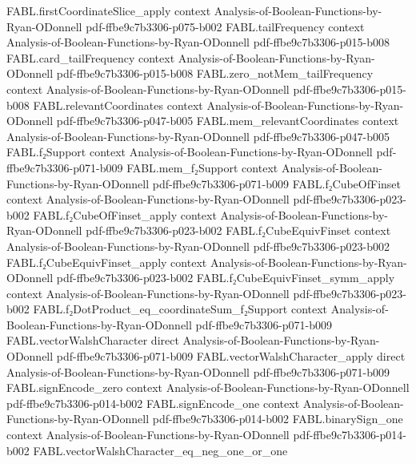 \begin{theorem}
\proofstep
  {FABL.firstCoordinateSlice_apply}
  {context}
  {Analysis-of-Boolean-Functions-by-Ryan-ODonnell}
  {pdf-ffbe9c7b3306-p075-b002}
\proofstep
  {FABL.tailFrequency}
  {context}
  {Analysis-of-Boolean-Functions-by-Ryan-ODonnell}
  {pdf-ffbe9c7b3306-p015-b008}
\proofstep
  {FABL.card_tailFrequency}
  {context}
  {Analysis-of-Boolean-Functions-by-Ryan-ODonnell}
  {pdf-ffbe9c7b3306-p015-b008}
\proofstep
  {FABL.zero_notMem_tailFrequency}
  {context}
  {Analysis-of-Boolean-Functions-by-Ryan-ODonnell}
  {pdf-ffbe9c7b3306-p015-b008}
\proofstep
  {FABL.relevantCoordinates}
  {context}
  {Analysis-of-Boolean-Functions-by-Ryan-ODonnell}
  {pdf-ffbe9c7b3306-p047-b005}
\proofstep
  {FABL.mem_relevantCoordinates}
  {context}
  {Analysis-of-Boolean-Functions-by-Ryan-ODonnell}
  {pdf-ffbe9c7b3306-p047-b005}
\proofstep
  {FABL.f₂Support}
  {context}
  {Analysis-of-Boolean-Functions-by-Ryan-ODonnell}
  {pdf-ffbe9c7b3306-p071-b009}
\proofstep
  {FABL.mem_f₂Support}
  {context}
  {Analysis-of-Boolean-Functions-by-Ryan-ODonnell}
  {pdf-ffbe9c7b3306-p071-b009}
\proofstep
  {FABL.f₂CubeOfFinset}
  {context}
  {Analysis-of-Boolean-Functions-by-Ryan-ODonnell}
  {pdf-ffbe9c7b3306-p023-b002}
\proofstep
  {FABL.f₂CubeOfFinset_apply}
  {context}
  {Analysis-of-Boolean-Functions-by-Ryan-ODonnell}
  {pdf-ffbe9c7b3306-p023-b002}
\proofstep
  {FABL.f₂CubeEquivFinset}
  {context}
  {Analysis-of-Boolean-Functions-by-Ryan-ODonnell}
  {pdf-ffbe9c7b3306-p023-b002}
\proofstep
  {FABL.f₂CubeEquivFinset_apply}
  {context}
  {Analysis-of-Boolean-Functions-by-Ryan-ODonnell}
  {pdf-ffbe9c7b3306-p023-b002}
\proofstep
  {FABL.f₂CubeEquivFinset_symm_apply}
  {context}
  {Analysis-of-Boolean-Functions-by-Ryan-ODonnell}
  {pdf-ffbe9c7b3306-p023-b002}
\proofstep
  {FABL.f₂DotProduct_eq_coordinateSum_f₂Support}
  {context}
  {Analysis-of-Boolean-Functions-by-Ryan-ODonnell}
  {pdf-ffbe9c7b3306-p071-b009}
\proofstep
  {FABL.vectorWalshCharacter}
  {direct}
  {Analysis-of-Boolean-Functions-by-Ryan-ODonnell}
  {pdf-ffbe9c7b3306-p071-b009}
\proofstep
  {FABL.vectorWalshCharacter_apply}
  {direct}
  {Analysis-of-Boolean-Functions-by-Ryan-ODonnell}
  {pdf-ffbe9c7b3306-p071-b009}
\proofstep
  {FABL.signEncode_zero}
  {context}
  {Analysis-of-Boolean-Functions-by-Ryan-ODonnell}
  {pdf-ffbe9c7b3306-p014-b002}
\proofstep
  {FABL.signEncode_one}
  {context}
  {Analysis-of-Boolean-Functions-by-Ryan-ODonnell}
  {pdf-ffbe9c7b3306-p014-b002}
\proofstep
  {FABL.binarySign_one}
  {context}
  {Analysis-of-Boolean-Functions-by-Ryan-ODonnell}
  {pdf-ffbe9c7b3306-p014-b002}
\proofstep
  {FABL.vectorWalshCharacter_eq_neg_one_or_one}

\end{theorem}
